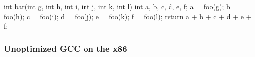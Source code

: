 \documentclass{plt}
\begin{document}
\newsavebox{\callbox}
\begin{lrbox}{\callbox}
\begin{C}
int bar(int g, int h, int i,
        int j, int k, int l)
{
  int a, b, c, d, e, f;
  a = foo(g);
  b = foo(h);
  c = foo(i);
  d = foo(j);
  e = foo(k);
  f = foo(l);
  return a + b + c + d + e + f;
}
\end{C}
\end{lrbox}


\begin{frame}[fragile]
  \frametitle{Unoptimized GCC on the x86}

\begin{columns}
  \begin{column}{0.65\textwidth}
\fontsize{9}{9}\selectfont
{}
  \end{column}
  \begin{column}{0.45\textwidth}
    \usebox{\callbox}
  \end{column}
\end{columns}
\end{frame}
\end{document}
